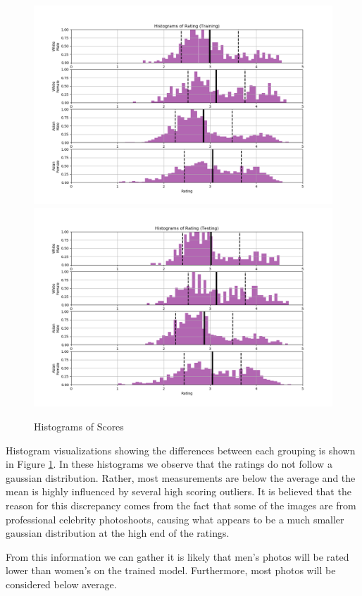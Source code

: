 \documentclass{article}
\begin{document}
\begin{figure}[H]
    \centering
    \includegraphics[width=.9\linewidth]{hist-train.png}
    \includegraphics[width=.9\linewidth]{hist-test.png}
    \caption{Histograms of Scores}
    \label{histograms}
\end{figure}

Histogram visualizations showing the differences between each grouping is shown in Figure \ref{histograms}.  In these histograms we observe that the ratings do not follow a gaussian distribution.  Rather, most measurements are below the average and the mean is highly influenced by several high scoring outliers.  It is believed that the reason for this discrepancy comes from the fact that some of the images are from professional celebrity photoshoots, causing what appears to be a much smaller gaussian distribution at the high end of the ratings.

From this information we can gather it is likely that men's photos will be rated lower than women's on the trained model.  Furthermore, most photos will be considered below average.
\end{document}
